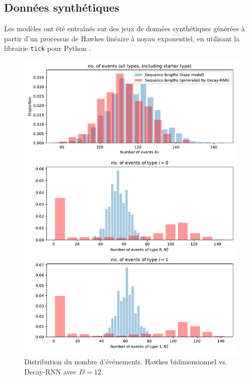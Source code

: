 \documentclass[11pt]{article}
\begin{document}
\subsection{Données synthétiques}

Les modèles ont été entraînés sur des jeux de données synthétiques générées à partir d'un processus de Hawkes linéaire à noyau exponentiel, en utilisant la librairie \verb|tick| pour Python \cite{2017arXiv170703003B}.

\begin{figure}[h]
	\includegraphics[width=\linewidth]{../results/seq_length_distrib_Decay-RNN-2d-hidden_16.pdf}
	\caption{Distribution du nombre d'événements. Hawkes bidimensionnel vs. Decay-RNN avec $D=12$.}\label{fig:hawkesDecayRNNlengthDistrib}
\end{figure}


\printbibliography

\begin{appendices}
	


\end{appendices}
\end{document}
